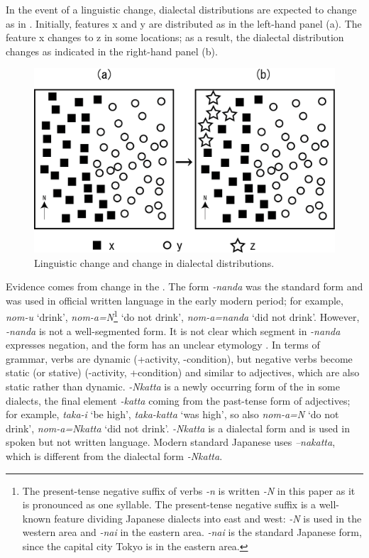 \documentclass[output=paper]{LSP/langsci}
\begin{document}
In the event of a linguistic change, dialectal distributions are expected to change as in . Initially, features x and y are distributed as in the left-hand panel (a). The feature x changes to z in some locations; as a result, the dialectal distribution changes as indicated in the right-hand panel (b).

\begin{figure}
\includegraphics[width=\textwidth]{illustrations/onishi_fig1}
\caption{Linguistic change and change in dialectal distributions.}
\label{fig:1}
\end{figure}

Evidence comes from change in the . The form \textit{-nanda} was the standard form and was used in official written language in the early modern period; for example, \textit{nom-u} ‘drink’, \textit{nom-a=N}\footnote{ The present-tense negative suffix of verbs \textit{-n} is written \textit{-N} in this paper as it is pronounced as one syllable. The present-tense negative suffix is a well-known feature dividing Japanese dialects into east and west: \textit{-N} is used in the western area and \textit{-nai} in the eastern area. \textit{-nai} is the standard Japanese form, since the capital city Tokyo is in the eastern area.} ‘do not drink’, \textit{nom-a=nanda} ‘did not drink’. However, \textit{{}-nanda} is not a well-segmented form. It is not clear which segment in \textit{-nanda} expresses negation, and the form has an unclear etymology \citep{onishi_atarashii_1999}. In terms of grammar, verbs are dynamic (+activity, -condition), but negative verbs become static (or stative) (-activity, +condition) and similar to adjectives, which are also static rather than dynamic. \textit{-Nkatta} is a newly occurring form of the  in some dialects, the final element \textit{{}-katta} coming from the past-tense form of adjectives; for example, \textit{taka-i} ‘be high’, \textit{taka-katta} ‘was high’,  so also \textit{nom-a=N} ‘do not drink’, \textit{nom-a=Nkatta} ‘did not drink’. \textit{-Nkatta} is a dialectal form and is used in spoken but not written language. Modern standard Japanese uses \textit{–nakatta}, which is different from the dialectal form \textit{-Nkatta}. 
\end{document}
